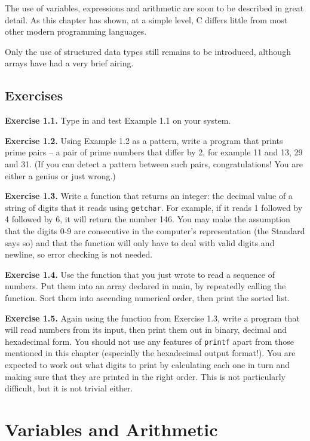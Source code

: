   The use of variables, expressions and arithmetic are soon to be described
   in great detail. As this chapter has shown, at a simple level, C differs
   little from most other modern programming languages.


  Only the use of structured data types still remains to be introduced,
   although arrays have had a very brief airing.


 
        \section{Exercises}
        


  \textbf{Exercise 1.1.} Type in and test Example 1.1 on your
   system.


  \textbf{Exercise 1.2.} Using Example 1.2 as a pattern, write a
   program that prints prime pairs -- a pair of prime numbers that differ
   by 2, for example 11 and 13, 29 and 31. (If you can detect a pattern
   between such pairs, congratulations! You are either a genius or just
   wrong.)


  \textbf{Exercise 1.3.} Write a function that returns an integer: the decimal
   value of a string of digits that it reads using \texttt{getchar}. For
   example, if it reads 1 followed by 4 followed by 6, it will
   return the number 146.  You may make the assumption that the
   digits 0-9 are consecutive in the computer's representation (the
   Standard says so) and that the function will only have to deal with valid
   digits and newline, so error checking is not needed.


  \textbf{Exercise 1.4.} Use the function that you just wrote to read a sequence
   of numbers.  Put them into an array declared in main, by repeatedly calling
   the function. Sort them into ascending numerical order, then print the
   sorted list.


  \textbf{Exercise 1.5.} Again using the function from Exercise 1.3, write a
   program that will read numbers from its input, then print them out in
   binary, decimal and hexadecimal form. You should not use any features of
   \texttt{printf} apart from those mentioned in this chapter (especially
   the hexadecimal output format!). You are expected to work out what digits
   to print by calculating each one in turn and making sure that they are
   printed in the right order. This is not particularly difficult, but it is
   not trivial either.


 \chapter{Variables and Arithmetic}\label{chap:varArith}



